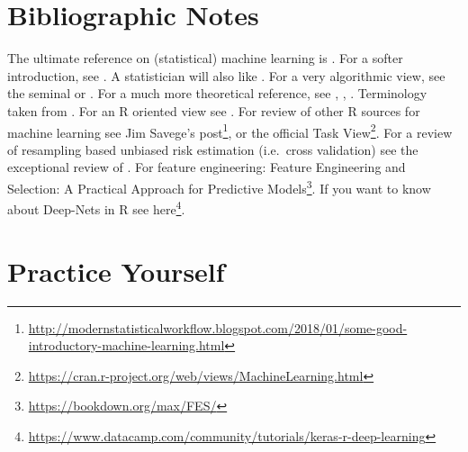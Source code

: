 \documentclass[]{book}
\renewcommand{\href}[2]{#2\footnote{\url{#1}}}
\theoremstyle{definition}
\theoremstyle{definition}
\theoremstyle{definition}
\theoremstyle{remark}
\begin{document}
\hypertarget{bibliographic-notes-8}{%
\section{Bibliographic Notes}\label{bibliographic-notes-8}}

The ultimate reference on (statistical) machine learning is \citet{friedman2001elements}.
For a softer introduction, see \citet{james2013introduction}.
A statistician will also like \citet{ripley2007pattern}.
For a very algorithmic view, see the seminal \citet{leskovec2014mining} or \citet{conway2012machine}.
For a much more theoretical reference, see \citet{mohri2012foundations}, \citet{vapnik2013nature}, \citet{shalev2014understanding}.
Terminology taken from \citet{sammut2011encyclopedia}.
For an R oriented view see \citet{lantz2013machine}.
For review of other R sources for machine learning see \href{http://modernstatisticalworkflow.blogspot.com/2018/01/some-good-introductory-machine-learning.html}{Jim Savege's post}, or the official \href{https://cran.r-project.org/web/views/MachineLearning.html}{Task View}.
For a review of resampling based unbiased risk estimation (i.e.~cross validation) see the exceptional review of \citet{arlot2010survey}.
For feature engineering: \href{https://bookdown.org/max/FES/}{Feature Engineering and Selection: A Practical Approach for Predictive Models}.
If you want to know about Deep-Nets in R see \href{https://www.datacamp.com/community/tutorials/keras-r-deep-learning}{here}.

\hypertarget{practice-yourself-6}{%
\section{Practice Yourself}\label{practice-yourself-6}}
\end{document}
